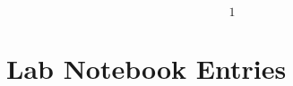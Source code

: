 \documentclass{article} %
\begin{document}
\textbf{}

\noindent \textbf{}

\noindent \textbf{}

\noindent \textbf{}

\noindent \textbf{}

\noindent \textbf{}

\noindent \textbf{}

\noindent \textbf{}

\noindent \textbf{}

\noindent \textbf{}

\noindent \textbf{}

\noindent \textbf{}

\noindent \textbf{}

\noindent \textbf{}

\noindent \textbf{}

\noindent \textbf{}

\noindent \textbf{}

\noindent \textbf{}

\noindent \textbf{}

\noindent \textbf{}

\noindent \textbf{}

\noindent \textbf{}

\noindent \textbf{}

\noindent \textbf{}

\noindent \textbf{}

\noindent \textbf{}

\noindent \textbf{}

\noindent \textbf{}

\noindent \textbf{}

\noindent \textbf{}

\noindent \textbf{}

\noindent \textbf{}

\noindent \textbf{}

\noindent \textbf{}

\noindent \textbf{}

\noindent \textbf{}

\noindent \textbf{}

\noindent \textbf{}

\noindent \textbf{}

\noindent \textbf{}

\noindent \textbf{}
\[1\] 

\section{Lab Notebook Entries}
\end{document}
